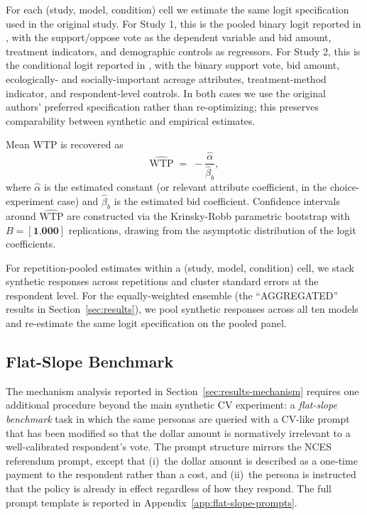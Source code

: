 \documentclass[12pt]{article}
\begin{document}
For each (study, model, condition) cell we estimate the same logit specification used in the original study. For Study 1, this is the pooled binary logit reported in \textcite{Aldy2012}, with the support/oppose vote as the dependent variable and bid amount, treatment indicators, and demographic controls as regressors. For Study 2, this is the conditional logit reported in \textcite{Giguere2020}, with the binary support vote, bid amount, ecologically- and socially-important acreage attributes, treatment-method indicator, and respondent-level controls. In both cases we use the original authors' preferred specification rather than re-optimizing; this preserves comparability between synthetic and empirical estimates.

Mean WTP is recovered as
\begin{equation}
    \widehat{\text{WTP}} \;=\; -\frac{\hat{\alpha}}{\hat{\beta}_b},
    \label{eq:wtp}
\end{equation}
where $\hat{\alpha}$ is the estimated constant (or relevant attribute coefficient, in the choice-experiment case) and $\hat{\beta}_b$ is the estimated bid coefficient. Confidence intervals around $\widehat{\text{WTP}}$ are constructed via the Krinsky-Robb parametric bootstrap with $B = [\textbf{1{,}000}]$ replications, drawing from the asymptotic distribution of the logit coefficients.

For repetition-pooled estimates within a (study, model, condition) cell, we stack synthetic responses across repetitions and cluster standard errors at the respondent level. For the equally-weighted ensemble (the ``AGGREGATED'' results in Section~\ref{sec:results}), we pool synthetic responses across all ten models and re-estimate the same logit specification on the pooled panel.

\subsection{Flat-Slope Benchmark}\label{sec:methods-mechanism}

The mechanism analysis reported in Section~\ref{sec:results-mechanism} requires one additional procedure beyond the main synthetic CV experiment: a \textit{flat-slope benchmark} task in which the same personas are queried with a CV-like prompt that has been modified so that the dollar amount is normatively irrelevant to a well-calibrated respondent's vote. The prompt structure mirrors the NCES referendum prompt, except that (i)~the dollar amount is described as a one-time payment to the respondent rather than a cost, and (ii)~the persona is instructed that the policy is already in effect regardless of how they respond. The full prompt template is reported in Appendix~\ref{app:flat-slope-prompts}.
\end{document}
